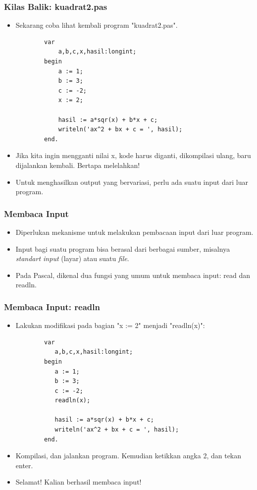 \documentclass{beamer}
\begin{document}
\begin{frame}[fragile]
\frametitle{Kilas Balik: kuadrat2.pas}
\begin{itemize}
	\item Sekarang coba lihat kembali program "kuadrat2.pas".
	\begin{lstlisting}
		var
		    a,b,c,x,hasil:longint;
		begin
		    a := 1;
		    b := 3;
		    c := -2;
		    x := 2;	    

		    hasil := a*sqr(x) + b*x + c;
		    writeln('ax^2 + bx + c = ', hasil);
		end.
	\end{lstlisting}
	\item Jika kita ingin mengganti nilai x, kode harus diganti, dikompilasi ulang, baru dijalankan kembali. Bertapa melelahkan!
	\item Untuk menghasilkan output yang bervariasi, perlu ada suatu input dari luar program.
\end{itemize}
\end{frame}

\begin{frame}
\frametitle{Membaca Input}
\begin{itemize}	
	\item Diperlukan mekanisme untuk melakukan pembacaan input dari luar program.
	\item Input bagi suatu program bisa berasal dari berbagai sumber, misalnya \textit{standart input} (layar) atau suatu \textit{file}.
	\item Pada Pascal, dikenal dua fungsi yang umum untuk membaca input: \alert{read} dan \alert{readln}.
\end{itemize}
\end{frame}

\begin{frame}[fragile]
\frametitle{Membaca Input: readln}
\begin{itemize}
	\item Lakukan modifikasi pada bagian "x := 2" menjadi "readln(x)":
	\begin{lstlisting}
		var
		   a,b,c,x,hasil:longint;
		begin
		   a := 1;
		   b := 3;
		   c := -2;
		   readln(x);
		
		   hasil := a*sqr(x) + b*x + c;
		   writeln('ax^2 + bx + c = ', hasil);
		end.
	\end{lstlisting}
	\item Kompilasi, dan jalankan program. Kemudian ketikkan angka 2, dan tekan enter.
	\item Selamat! Kalian berhasil membaca input!
\end{itemize}
\end{frame}
\end{document}

